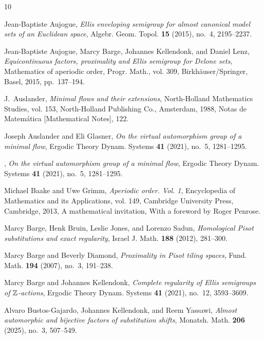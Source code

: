 \documentclass[12pt]{amsart}
\theoremstyle{definition}
\numberwithin{equation}{section}
\begin{document}
\begin{thebibliography}{10}

Jean-Baptiste Aujogue, \emph{Ellis enveloping semigroup for almost canonical
  model sets of an {E}uclidean space}, Algebr. Geom. Topol. \textbf{15} (2015),
  no.~4, 2195--2237. 

Jean-Baptiste Aujogue, Marcy Barge, Johannes Kellendonk, and Daniel Lenz,
  \emph{Equicontinuous factors, proximality and {E}llis semigroup for {D}elone
  sets}, Mathematics of aperiodic order, Progr. Math., vol. 309,
  Birkh\"{a}user/Springer, Basel, 2015, pp.~137--194. 

J.~Auslander, \emph{Minimal flows and their extensions}, North-Holland
  Mathematics Studies, vol. 153, North-Holland Publishing Co., Amsterdam, 1988,
  Notas de Matem\'atica [Mathematical Notes], 122. 

Joseph Auslander and Eli Glasner, \emph{On the virtual automorphism group of a
  minimal flow}, Ergodic Theory Dynam. Systems \textbf{41} (2021), no.~5,
  1281--1295. 

\bysame, \emph{On the virtual automorphism group of a minimal flow}, Ergodic
  Theory Dynam. Systems \textbf{41} (2021), no.~5, 1281--1295. 

Michael Baake and Uwe Grimm, \emph{Aperiodic order. {V}ol. 1}, Encyclopedia of
  Mathematics and its Applications, vol. 149, Cambridge University Press,
  Cambridge, 2013, A mathematical invitation, With a foreword by Roger Penrose.

Marcy Barge, Henk Bruin, Leslie Jones, and Lorenzo Sadun, \emph{Homological
  {P}isot substitutions and exact regularity}, Israel J. Math. \textbf{188}
  (2012), 281--300. 

Marcy Barge and Beverly Diamond, \emph{Proximality in {P}isot tiling spaces},
  Fund. Math. \textbf{194} (2007), no.~3, 191--238. 

Marcy Barge and Johannes Kellendonk, \emph{Complete regularity of {E}llis
  semigroups of {$\Bbb Z$}-actions}, Ergodic Theory Dynam. Systems \textbf{41}
  (2021), no.~12, 3593--3609. 

Alvaro Bustos-Gajardo, Johannes Kellendonk, and Reem Yassawi, \emph{Almost
  automorphic and bijective factors of substitution shifts}, Monatsh. Math.
  \textbf{206} (2025), no.~3, 507--549. 


\end{thebibliography}
\end{document}
